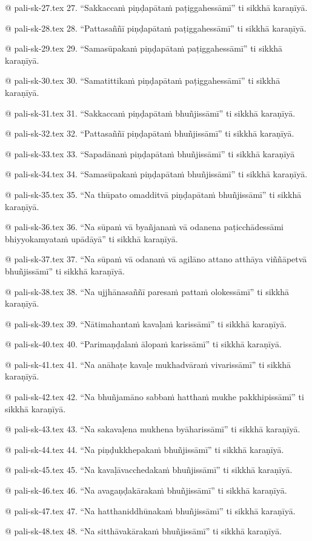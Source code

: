 @ pali-sk-27.tex
27. “Sakkaccaṁ piṇḍapātaṁ paṭiggahessāmī” ti sikkhā karaṇīyā.

@ pali-sk-28.tex
28. “Pattasaññī piṇḍapātaṁ paṭiggahessāmī” ti sikkhā karaṇīyā.

@ pali-sk-29.tex
29. “Samasūpakaṁ piṇḍapātaṁ paṭiggahessāmī” ti sikkhā karaṇīyā.

@ pali-sk-30.tex
30. “Samatittikaṁ piṇḍapātaṁ paṭiggahessāmī” ti sikkhā karaṇīyā.

@ pali-sk-31.tex
31. “Sakkaccaṁ piṇḍapātaṁ bhuñjissāmī” ti sikkhā karaṇīyā.

@ pali-sk-32.tex
32. “Pattasaññī piṇḍapātaṁ bhuñjissāmī” ti sikkhā karaṇīyā.

@ pali-sk-33.tex
33. “Sapadānaṁ piṇḍapātaṁ bhuñjissāmī” ti sikkhā karaṇīyā

@ pali-sk-34.tex
34. “Samasūpakaṁ piṇḍapātaṁ bhuñjissāmī” ti sikkhā karaṇīyā.

@ pali-sk-35.tex
35. “Na thūpato omadditvā piṇḍapātaṁ bhuñjissāmī” ti sikkhā karaṇīyā.

@ pali-sk-36.tex
36. “Na sūpaṁ vā byañjanaṁ vā odanena paṭicchādessāmi bhiyyokamyataṁ upādāyā” ti sikkhā karaṇīyā.

@ pali-sk-37.tex
37. “Na sūpaṁ vā odanaṁ vā agilāno attano atthāya viññāpetvā bhuñjissāmī” ti sikkhā karaṇīyā.

@ pali-sk-38.tex
38. “Na ujjhānasaññī paresaṁ pattaṁ olokessāmī” ti sikkhā karaṇīyā.

@ pali-sk-39.tex
39. “Nātimahantaṁ kavaḷaṁ karissāmī” ti sikkhā karaṇīyā.

@ pali-sk-40.tex
40. “Parimaṇḍalaṁ ālopaṁ karissāmī” ti sikkhā karaṇīyā.

@ pali-sk-41.tex
41. “Na anāhaṭe kavaḷe mukhadvāraṁ vivarissāmī” ti sikkhā karaṇīyā.

@ pali-sk-42.tex
42. “Na bhuñjamāno sabbaṁ hatthaṁ mukhe pakkhipissāmī” ti sikkhā karaṇīyā.

@ pali-sk-43.tex
43. “Na sakavaḷena mukhena byāharissāmī” ti sikkhā karaṇīyā.

@ pali-sk-44.tex
44. “Na piṇḍukkhepakaṁ bhuñjissāmī” ti sikkhā karaṇīyā.

@ pali-sk-45.tex
45. “Na kavaḷāvacchedakaṁ bhuñjissāmī” ti sikkhā karaṇīyā.

@ pali-sk-46.tex
46. “Na avagaṇḍakārakaṁ bhuñjissāmī” ti sikkhā karaṇīyā.

@ pali-sk-47.tex
47. “Na hatthaniddhūnakaṁ bhuñjissāmī” ti sikkhā karaṇīyā.

@ pali-sk-48.tex
48. “Na sitthāvakārakaṁ bhuñjissāmī” ti sikkhā karaṇīyā.

